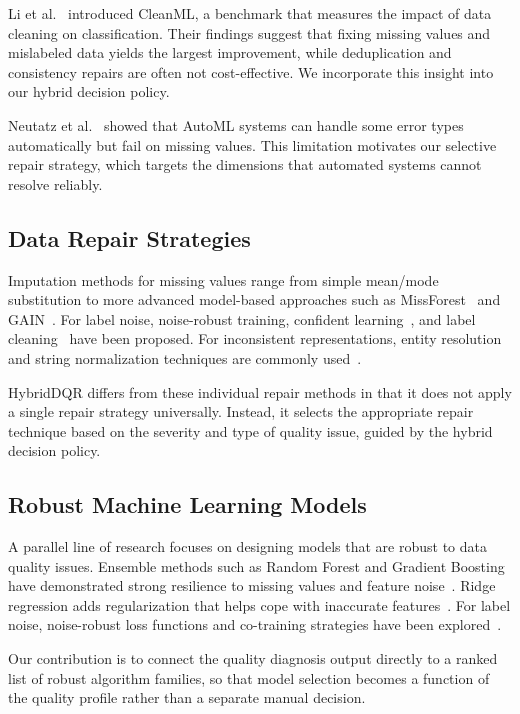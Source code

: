 \documentclass[runningheads]{llncs}
\begin{document}
Li et al.~\cite{li2021cleanml} introduced CleanML, a benchmark that
measures the impact of data cleaning on classification.
Their findings suggest that fixing missing values and mislabeled data
yields the largest improvement, while deduplication and consistency
repairs are often not cost-effective.
We incorporate this insight into our hybrid decision policy.

Neutatz et al.~\cite{neutatz2022} showed that AutoML systems can
handle some error types automatically but fail on missing values.
This limitation motivates our selective repair strategy, which
targets the dimensions that automated systems cannot resolve reliably.

\subsection{Data Repair Strategies}

Imputation methods for missing values range from simple
mean/mode substitution to more advanced model-based approaches
such as MissForest~\cite{stekhoven2012} and GAIN~\cite{yoon2018gain}.
For label noise, noise-robust training, confident learning~\cite{northcutt2021},
and label cleaning~\cite{frenayverleys2014} have been proposed.
For inconsistent representations, entity resolution and
string normalization techniques are commonly used~\cite{getoor2012}.

HybridDQR differs from these individual repair methods in that
it does not apply a single repair strategy universally.
Instead, it selects the appropriate repair technique based on
the severity and type of quality issue, guided by the hybrid
decision policy.

\subsection{Robust Machine Learning Models}

A parallel line of research focuses on designing models that are
robust to data quality issues.
Ensemble methods such as Random Forest and Gradient Boosting
have demonstrated strong resilience to missing values and
feature noise~\cite{breiman2001}.
Ridge regression adds regularization that helps cope with
inaccurate features~\cite{hoerl2000}.
For label noise, noise-robust loss functions and
co-training strategies have been explored~\cite{natarajan2013}.

Our contribution is to connect the quality diagnosis output
directly to a ranked list of robust algorithm families,
so that model selection becomes a function of the quality profile
rather than a separate manual decision.
\end{document}
